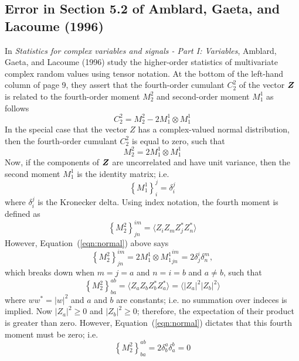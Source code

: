 \documentclass[twocolumn]{aastex6}
\newcommand{\mbf}[1]{\mbox{\boldmath $#1$}}
\newcommand{\Eqn}[1]{Equation~(\ref{eqn:#1})}
\begin{document}
{\begin{appendix}
%
%

\subsection{Error in Section 5.2 of Amblard, Gaeta, and Lacoume (1996)}
\label{sec:error_in_agl96}

\noindent
In {\it Statistics for complex variables and signals - Part I: Variables},
Amblard, Gaeta, and Lacoume (1996) study the higher-order statistics of
multivariate complex random values using tensor notation.
%
At the bottom of the left-hand column of page 9, they assert that the
fourth-order cumulant $C_2^2$ of the vector $\mbf{Z}$ is related to
the fourth-order moment $M_2^2$ and second-order moment $M_1^1$ as
follows
%
\begin{equation}
C_2^2 = M_2^2 - 2 M_1^1 \otimes M_1^1
\end{equation}
%
In the special case that the vector \mbf{Z} has a complex-valued
normal distribution, then the fourth-order cumulant $C_2^2$ is equal
to zero, such that
%
\begin{equation}
\label{eqn:normal}
M_2^2 = 2 M_1^1 \otimes M_1^1
\end{equation}
%
Now, if the components of $\mbf{Z}$ are uncorrelated and have unit
variance, then the second moment $M_1^1$ is the identity matrix; i.e.
%
\[
\left\{M_1^1\right\}_i^j = \delta_i^j
\]
%
where $\delta_i^j$ is the Kronecker delta.  Using index notation, the
fourth moment is defined as
%
\begin{equation}
\left\{M_2^2\right\}^{im}_{jn} = \langle Z_i Z_m Z_j^* Z_n^* \rangle
\end{equation}
%
However, \Eqn{normal} above says
\begin{equation}
\left\{M_2^2\right\}^{im}_{jn} = {2 M_1^1 \otimes M_1^1}^{im}_{jn} = 2 \delta^i_j \delta^m_n,
\end{equation}
%
which breaks down when $m=j=a$ and $n=i=b$ and $a \neq b$, such that
%
\begin{equation}
\left\{M_2^2\right\}^{ab}_{ba} = \langle Z_a Z_b Z_b^* Z_a^* \rangle = \langle |Z_a|^2 |Z_b|^2 \rangle
\end{equation}
%
where $w w^* = |w|^2$ and $a$ and $b$ are constants; i.e. no summation
over indeces is implied.
%
Now $|Z_a|^2 \ge 0$ and $|Z_b|^2 \ge 0$; therefore, the expectation of
their product is greater than zero.  However,
\Eqn{normal} dictates that this fourth moment must be zero;
i.e.
%
\[
\left\{M_2^2\right\}^{ab}_{ba} = 2 \delta^a_b \delta^b_a = 0
\]


\end{appendix}}
\end{document}
